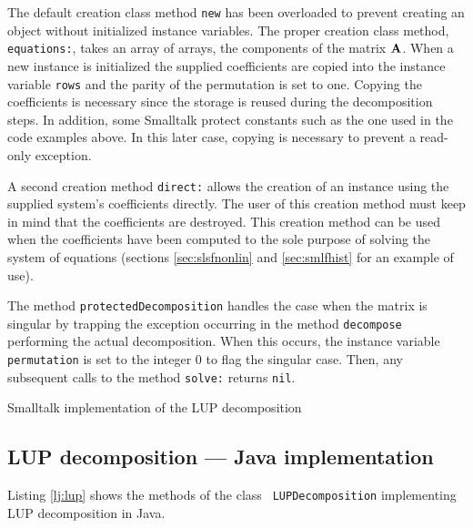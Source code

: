 \documentclass[twoside]{book}
\begin{document}
The default creation class method {\tt new} has been overloaded to
prevent creating an object without initialized instance variables.
The proper creation class method, {\tt equations:}, takes an array
of arrays, the components of the matrix ${\bf A}$. When a new
instance is initialized the supplied coefficients are copied into
the instance variable {\tt rows} and the parity of the permutation
is set to one. Copying the coefficients is necessary since the
storage is reused during the decomposition steps. In addition,
some Smalltalk protect constants such as the one used in the code
examples above. In this later case, copying is necessary to
prevent a read-only exception.

A second creation method {\tt direct:} allows the creation of an
instance using the supplied system's coefficients directly. The
user of this creation method must keep in mind that the
coefficients are destroyed. This creation method can be used when
the coefficients have been computed to the sole purpose of solving
the system of equations (\cf sections \ref{sec:slsfnonlin} and
\ref{sec:smlfhist} for an example of use).

The method {\tt protectedDecomposition} handles the case when the
matrix is singular by trapping the exception occurring in the
method {\tt decompose} performing the actual decomposition. When
this occurs, the instance variable {\tt permutation} is set to the
integer 0 to flag the singular case. Then, any subsequent calls to
the method {\tt solve:} returns {\tt nil}.

\begin{listing} Smalltalk implementation of the LUP decomposition
\label{ls:lup}

\end{listing}

\subsection{LUP decomposition --- Java implementation}
Listing \ref{lj:lup} shows the methods of the class {\tt
LUPDecomposition} implementing LUP decomposition in Java.
\end{document}
